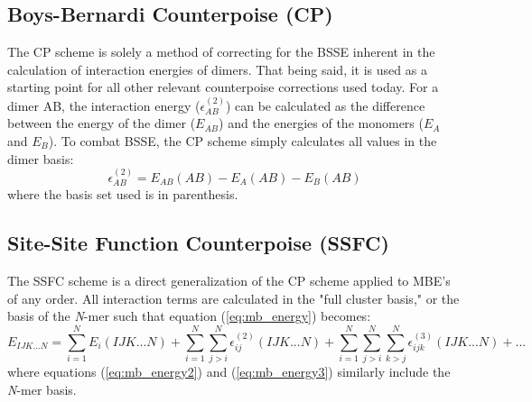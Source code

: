 \documentclass[a4paper,12pt]{article}
\begin{document}
    \subsection{Boys-Bernardi Counterpoise (CP)\cite{Boys1970}}
        The CP scheme is solely a method of correcting for the BSSE inherent in the calculation of interaction energies of dimers. That being said, it is used as a starting point for all other relevant counterpoise corrections used today. For a dimer AB, the interaction energy ($\epsilon_{AB}^{(2)}$) can be calculated as the difference between the energy of the dimer ($E_{AB}$) and the energies of the monomers ($E_A$ and $E_B$). To combat BSSE, the CP scheme simply calculates all values in the dimer basis:
        \begin{equation} \label{eq:cp}
            \epsilon_{AB}^{(2)} = E_{AB}(AB) - E_{A}(AB) - E_{B}(AB)
        \end{equation}
        where the basis set used is in parenthesis. 

    \subsection{Site-Site Function Counterpoise (SSFC)\cite{Wells1983}}
        The SSFC scheme is a direct generalization of the CP scheme applied to MBE's of any order. All interaction terms are calculated in the "full cluster basis," or the basis of the \textit{N}-mer such that equation (\ref{eq:mb_energy}) becomes:
        \begin{equation} \label{eq:SSFC_many-body}
            E_{IJK...N} = \sum_{i=1}^{N}E_{i}(IJK...N) + \sum_{i=1}^{N}\sum_{j>i}^{N}\epsilon_{ij}^{(2)}(IJK...N) + \sum_{i=1}^{N}\sum_{j>i}^{N}\sum_{k>j}^{N}\epsilon_{ijk}^{(3)}(IJK...N) + ...
        \end{equation} 
    where equations (\ref{eq:mb_energy2}) and (\ref{eq:mb_energy3}) similarly include the \textit{N}-mer basis.

        
\newpage


\end{document}
